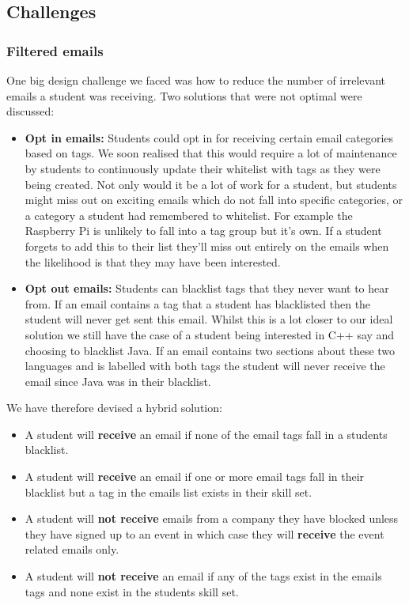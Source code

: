 \subsection{Challenges}
  \subsubsection{Filtered emails}
    One big design challenge we faced was how to reduce the number of irrelevant emails a student was receiving. Two solutions that were not optimal were discussed:
    \begin{itemize}
      \item \textbf{Opt in emails:} Students could opt in for receiving certain email categories based on tags. We soon realised that this would require a lot of maintenance by students to continuously update their whitelist with tags as they were being created.
      Not only would it be a lot of work for a student, but students might miss out on exciting emails which do not fall into specific categories, or a category a student had remembered to whitelist. For example the Raspberry Pi is unlikely to fall into a tag group but it's own. If a student forgets to add this to their list they'll miss out entirely on the emails when the likelihood is that they may have been interested.
      \item \textbf{Opt out emails:} Students can blacklist tags that they never want to hear from. If an email contains a tag that a student has blacklisted then the student will never get sent this email. Whilst this is a lot closer to our ideal solution we still have the case of a student being interested in C++ say and choosing to blacklist Java. If an email contains two sections about these two languages and is labelled with both tags the student will never receive the email since Java was in their blacklist.
    \end{itemize}

    We have therefore devised a hybrid solution:
    \begin{itemize}
      \item A student will \textbf{receive} an email if none of the email tags fall in a students blacklist.
      \item A student will \textbf{receive} an email if one or more email tags fall in their blacklist but a tag in the emails list exists in their skill set.
      \item A student will \textbf{not receive} emails from a company they have blocked unless they have signed up to an event in which case they will \textbf{receive} the event related emails only.
      \item A student will \textbf{not receive} an email if any of the tags exist in the emails tags and none exist in the students skill set.
    \end{itemize}

